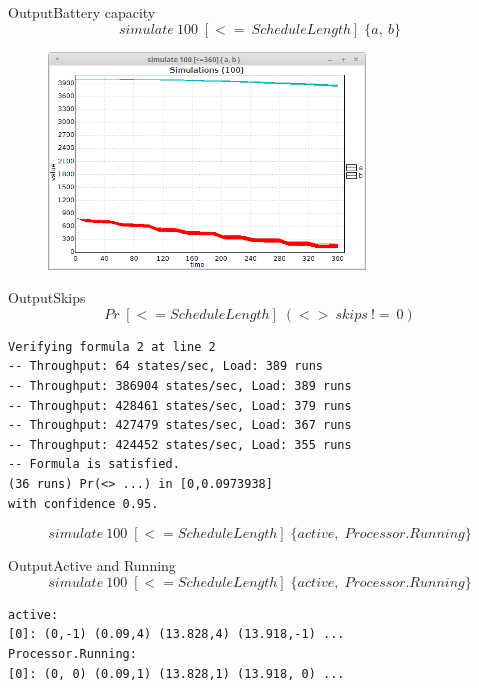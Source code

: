 \begin{frame}{Output}{Battery capacity}
	\begin{equation*}
		simulate\ 100 \; [<=\ ScheduleLength]\; \{ a,\ b\}
	\end{equation*}
	\begin{figure}
		\includegraphics[width=0.75\textwidth]{graphics/ab.png}
		\end{figure}
\end{frame}

\begin{frame}[fragile]{Output}{Skips}
	\begin{equation*}
Pr\; [<=ScheduleLength] \; (<> \ skips \ !=\ 0)
	\end{equation*}
	\begin{lstlisting}
Verifying formula 2 at line 2
-- Throughput: 64 states/sec, Load: 389 runs
-- Throughput: 386904 states/sec, Load: 389 runs
-- Throughput: 428461 states/sec, Load: 379 runs
-- Throughput: 427479 states/sec, Load: 367 runs
-- Throughput: 424452 states/sec, Load: 355 runs
-- Formula is satisfied.
(36 runs) Pr(<> ...) in [0,0.0973938]
with confidence 0.95.
	\end{lstlisting}
	\pause
	\begin{equation*}
		simulate\ 100 \; [<=ScheduleLength] \; \{active, \; Processor.Running\}
	\end{equation*}
\end{frame}

\begin{frame}[fragile]{Output}{Active and Running}
	\begin{equation*}
		simulate\ 100 \; [<=ScheduleLength] \; \{active, \; Processor.Running\}
	\end{equation*}
	\begin{lstlisting}
active:
[0]: (0,-1) (0.09,4) (13.828,4) (13.918,-1) ...
Processor.Running:
[0]: (0, 0) (0.09,1) (13.828,1) (13.918, 0) ...
	\end{lstlisting}
\end{frame}

